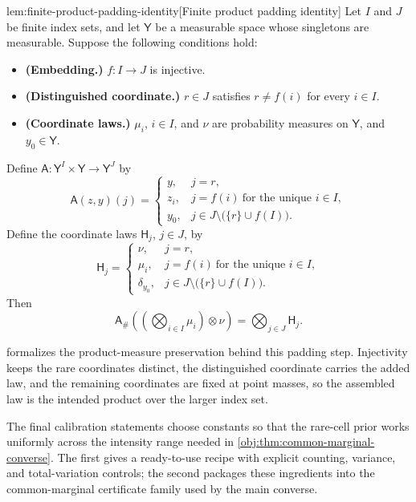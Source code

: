 \begin{lemmav}{lem:finite-product-padding-identity}[Finite product padding identity]
Let \(I\) and \(J\) be finite index sets, and let \(\mathsf Y\) be a measurable space whose singletons are measurable. Suppose the following conditions hold:
\begin{itemize}
\item \textbf{(Embedding.)} \(f:I\to J\) is injective.
\item \textbf{(Distinguished coordinate.)} \(r\in J\) satisfies \(r\ne f(i)\) for every \(i\in I\).
\item \textbf{(Coordinate laws.)} \(\mu_i\), \(i\in I\), and \(\nu\) are probability measures on \(\mathsf Y\), and \(y_0\in\mathsf Y\).
\end{itemize}
Define \(\mathsf A:\mathsf Y^I\times\mathsf Y\to\mathsf Y^J\) by
\[
\mathsf A(z,y)(j)=
\begin{cases}
y, & j=r,\\
z_i, & j=f(i)\ \text{for the unique } i\in I,\\
y_0, & j\in J\setminus\bigl(\{r\}\cup f(I)\bigr).
\end{cases}
\]
Define the coordinate laws \(\mathsf H_j\), \(j\in J\), by
\[
\mathsf H_j=
\begin{cases}
\nu, & j=r,\\
\mu_i, & j=f(i)\ \text{for the unique } i\in I,\\
\delta_{y_0}, & j\in J\setminus\bigl(\{r\}\cup f(I)\bigr).
\end{cases}
\]
Then
\[
\mathsf A_\#\left(\left(\bigotimes_{i\in I}\mu_i\right)\otimes\nu\right)
=
\bigotimes_{j\in J}\mathsf H_j .
\]
\end{lemmav}

 formalizes the product-measure preservation behind this padding step. Injectivity keeps the rare coordinates distinct, the distinguished coordinate carries the added law, and the remaining coordinates are fixed at point masses, so the assembled law is the intended product over the larger index set.

The final calibration statements choose constants so that the rare-cell prior works uniformly across the intensity range needed in \cref{obj:thm:common-marginal-converse}. The first gives a ready-to-use recipe with explicit counting, variance, and total-variation controls; the second packages these ingredients into the common-marginal certificate family used by the main converse.

